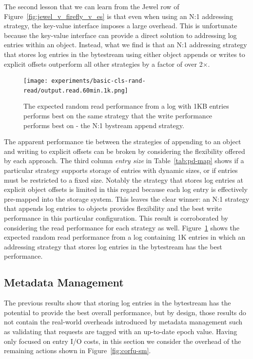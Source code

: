 \documentclass[10pt,twocolumn]{article}
\begin{document}
The second lesson that we can learn from the Jewel row of
Figure~\ref{fig:jewel_v_firefly_v_es} is that even when using an N:1 addressing
strategy, the key-value interface imposes a large overhead. This is unfortunate
because the key-value interface can provide a direct solution to addressing log
entries within an object.  Instead, what we find is that an N:1 addressing
strategy that stores log entries in the bytestream using either object appends
or writes to explicit offsets outperform all other strategies by a factor of
over 2\(\times\).

\begin{figure}[t]
      \centering
      \texttt{[image: experiments/basic-cls-rand-read/output.read.60min.1k.png]}
      \caption{The expected random read performance from a log with 1KB entries
      performs best on the same strategy that the write performance performs
      best on - the N:1 bystream append strategy.}
      \label{fig:vanilla_rd_jewel}
\end{figure}

The apparent performance tie between the strategies of appending to an object
and writing to explicit offsets can be broken by considering the flexibility
offered by each approach. The third column \emph{entry size} in
Table~\ref{tab:pd-map} shows if a particular strategy supports storage of
entries with dynamic sizes, or if entries must be restricted to a fixed size.
Notably the strategy that stores log entries at explicit object offsets is
limited in this regard because each log entry is effectively pre-mapped into
the storage system. This leaves the clear winner: an N:1 strategy that appends
log entries to objects provides flexibility and the best write performance in
this particular configuration.  This result is corroborated by considering the
read performance for each strategy as well. Figure~\ref{fig:vanilla_rd_jewel}
shows the expected random read performance from a log containing 1K entries in
which an addressing strategy that stores log entries in the bytestream has the
best performance.

\subsection{Metadata Management}

The previous results show that storing log entries in the bytestream has the
potential to provide the best overall performance, but by design, those
results do not contain the real-world overheads introduced by metadata
management such as validating that requests are tagged with an up-to-date
epoch value. Having only focused on entry I/O costs, in this section we
consider the overhead of the remaining actions shown in
Figure~\ref{fig:corfu-sm}.
\end{document}
